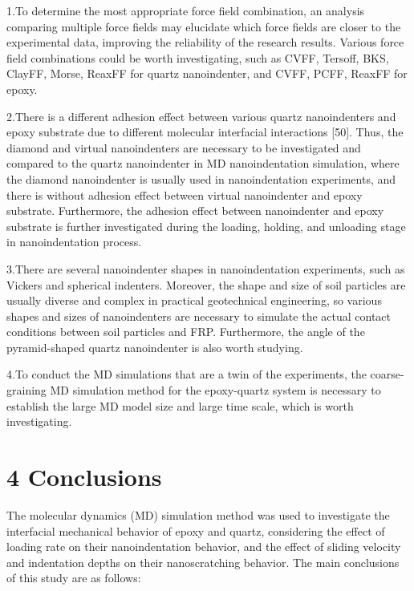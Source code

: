 \documentclass{article}
\begin{document}
\begin{hangpars}
1.\quad To determine the most appropriate force field combination, an analysis comparing multiple force fields may elucidate which force fields are closer to the experimental data, improving the reliability of the research results. Various force field combinations could be worth investigating, such as CVFF, Tersoff, BKS, ClayFF, Morse, ReaxFF for quartz nanoindenter, and CVFF, PCFF, ReaxFF for epoxy.

2.\quad There is a different adhesion effect between various quartz nanoindenters and epoxy substrate due to different molecular interfacial interactions [50]. Thus, the diamond and virtual nanoindenters are necessary to be investigated and compared to the quartz nanoindenter in MD nanoindentation simulation, where the diamond nanoindenter is usually used in nanoindentation experiments, and there is without adhesion effect between virtual nanoindenter and epoxy substrate. Furthermore, the adhesion effect between nanoindenter and epoxy substrate is further investigated during the loading, holding, and unloading stage in nanoindentation process.

3.\quad There are several nanoindenter shapes in nanoindentation experiments, such as Vickers and spherical indenters. Moreover, the shape and size of soil particles are usually diverse and complex in practical geotechnical engineering, so various shapes and sizes of nanoindenters are necessary to simulate the actual contact conditions between soil particles and FRP. Furthermore, the angle of the pyramid-shaped quartz nanoindenter is also worth studying.

4.\quad To conduct the MD simulations that are a twin of the experiments, the coarse-graining MD simulation method for the epoxy-quartz system is necessary to establish the large MD model size and large time scale, which is worth investigating.
\end{hangpars}

\section*{4 Conclusions}

The molecular dynamics (MD) simulation method was used to investigate the interfacial mechanical behavior of epoxy and quartz, considering the effect of loading rate on their nanoindentation behavior, and the effect of sliding velocity and indentation depths on their nanoscratching behavior. The main conclusions of this study are as follows:
\end{document}
